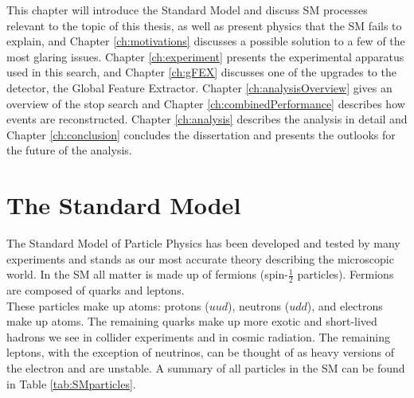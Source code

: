 This chapter will introduce the Standard Model and discuss SM processes relevant to the topic of this thesis, as well as present physics that the SM fails to explain, and Chapter \ref{ch:motivations} discusses a possible solution to a few of the most glaring issues.  Chapter \ref{ch:experiment} presents the experimental apparatus used in this search, and Chapter \ref{ch:gFEX} discusses one of the upgrades to the detector, the Global Feature Extractor.  Chapter \ref{ch:analysisOverview} gives an overview of the stop search and Chapter \ref{ch:combinedPerformance} describes how events are reconstructed.  Chapter \ref{ch:analysis} describes the analysis in detail and Chapter \ref{ch:conclusion} concludes the dissertation and presents the outlooks for the future of the analysis.  \\




\section{The Standard Model}

The Standard Model of Particle Physics has been developed and tested by many experiments and stands as our most accurate theory describing the microscopic world.  In the SM all matter is made up of fermions (spin-$\frac{1}{2} $ particles).  Fermions are composed of quarks and leptons.  \\%

These particles make up atoms: protons ($uud$), neutrons ($udd$), and electrons make up atoms.  The remaining quarks make up more exotic and short-lived hadrons we see in collider experiments and in cosmic radiation.  The remaining leptons, with the exception of neutrinos, can be thought of as heavy versions of the electron and are unstable.  A summary of all particles in the SM can be found in Table \ref{tab:SMparticles}. \\

